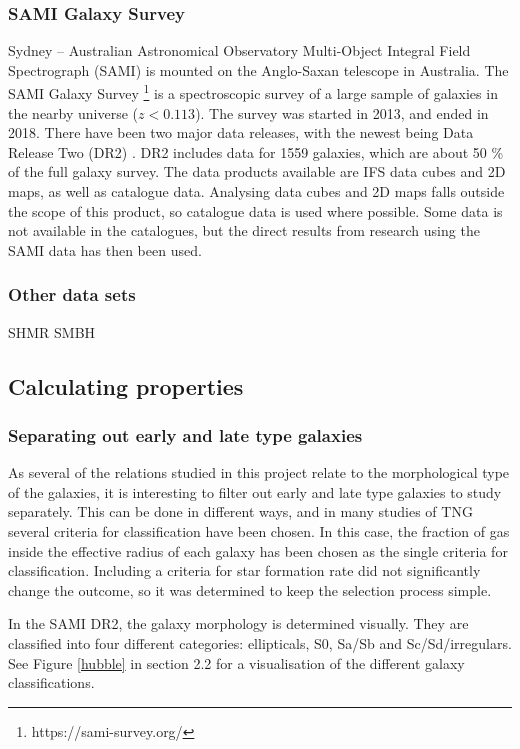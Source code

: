 \subsubsection{SAMI Galaxy Survey}
Sydney – Australian Astronomical Observatory Multi-Object Integral Field Spectrograph (SAMI) is mounted on the Anglo-Saxan telescope in Australia. The SAMI Galaxy Survey \footnote{https://sami-survey.org/} is a spectroscopic survey of a large sample of galaxies in the nearby universe ($z < 0.113$). The survey was started in 2013, and ended in 2018. There have been two major data releases, with the newest being Data Release Two (DR2) \parencite{Scott2018}. DR2 includes data for 1559 galaxies, which are about 50 \% of the full galaxy survey. The data products available are IFS data cubes and 2D maps, as well as catalogue data. Analysing data cubes and 2D maps falls outside the scope of this product, so catalogue data is used where possible. Some data is not available in the catalogues, but the direct results from research using the SAMI data has then been used.

\subsubsection{Other data sets}
SHMR
SMBH

\subsection{Calculating properties}


\subsubsection{Separating out early and late type galaxies}
As several of the relations studied in this project relate to the morphological type of the galaxies, it is interesting to filter out early and late type galaxies to study separately. This can be done in different ways, and in many studies of TNG several criteria for classification have been chosen. In this case, the fraction of gas inside the effective radius of each galaxy has been chosen as the single criteria for classification. Including a criteria for star formation rate did not significantly change the outcome, so it was determined to keep the selection process simple.

In the SAMI DR2, the galaxy morphology is determined visually. They are classified into four different categories: ellipticals, S0, Sa/Sb and Sc/Sd/irregulars. See Figure \ref{hubble} in section 2.2 for a visualisation of the different galaxy classifications.

